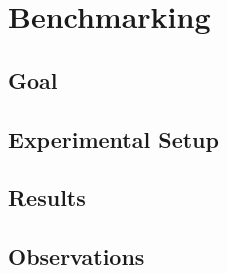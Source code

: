 \chapter{Benchmarking}
\label{sec:benchmarking}

\section{Goal}
\section{Experimental Setup}
\section{Results}
\section{Observations}